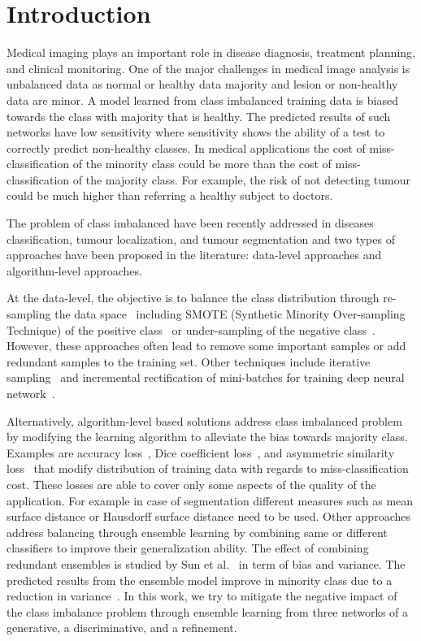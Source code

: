 \documentclass[10pt,twocolumn,letterpaper]{article}
\begin{document}
\section{Introduction}\label{intro}
Medical imaging plays an important role in disease diagnosis, treatment planning, and clinical monitoring. One of the major challenges in medical image analysis is unbalanced data as normal or healthy data majority and lesion or non-healthy data are minor. A model learned from class imbalanced training data is biased towards the class with majority that is healthy. The predicted results of such networks have low sensitivity where sensitivity shows the ability of a test to correctly predict non-healthy classes. In medical applications the cost of miss-classification of the minority class could be more than the cost of miss-classification of the majority class. For example, the risk of not detecting tumour could be much higher than referring a healthy subject to doctors.

The problem of class imbalanced have been recently addressed in diseases classification, tumour localization, and tumour segmentation and two types of approaches have been proposed in the literature: data-level approaches and algorithm-level approaches.

At the data-level, the objective is to balance the class distribution through re-sampling the data space~\cite{kohli2017medical} including SMOTE (Synthetic Minority Over-sampling Technique) of the positive class~\cite{douzas2018effective,mariani2018bagan} or under-sampling of the negative class~\cite{6914453}.
However, these approaches often lead to remove some important samples or add redundant samples to the training set.
Other techniques include iterative sampling~\cite{morales2012image} and incremental rectification of mini-batches for training deep neural network~\cite{dong2018imbalanced}.

Alternatively, algorithm-level based solutions address class imbalanced problem by modifying the learning algorithm to alleviate the bias towards majority class. Examples are accuracy loss~\cite{sudre2017generalised}, Dice coefficient loss~\cite{isensee2017brain,isensee2017automatic}, and asymmetric similarity loss~\cite{D11078} that modify distribution of training data with regards to miss-classification cost. These losses are able to cover only some aspects of the quality of the application. For example in case of segmentation different measures such as mean surface distance or Hausdorff surface distance need to be used.
Other approaches address balancing through ensemble learning by combining same or different classifiers to improve their generalization ability. The effect of combining redundant ensembles is studied by Sun et al.~\cite{sun2007cost} in term of bias and variance. The predicted results from the ensemble model improve in minority class due to a reduction in variance~\cite{sun2007cost}. In this work, we try to mitigate the negative impact of the class imbalance problem through ensemble learning from three networks of a generative, a discriminative, and a refinement.
\end{document}
